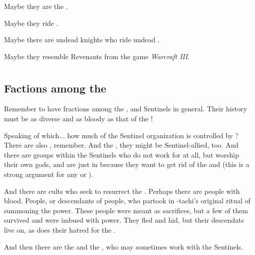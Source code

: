 Maybe they are the . 

Maybe they ride \hs{\vreiiden}.

Maybe there are undead knights who ride undead \vreiiden.

Maybe they resemble Revenants from the game \emph{Warcraft III}. 























\section{\Dragons}
\label{Dragons}
\subsection{Factions among the \dragons}
Remember to have fractions among the \dragons{}, and Sentinels in general. Their history must be as diverse and as bloody as that of the \resphain!

Speaking of which... how much of the Sentinel organization is controlled by \dragons? There are also \rachyth, remember. And the \Baelzerach, they might be Sentinel-allied, too. And there are groups within the Sentinels who do not work for \dragons{} at all, but worship their own gods, and are just in because they want to get rid of the \banes{} and \resphain{} (this is a strong argument for any \scatha{} or \rachyth). 

And there are cults who seek to resurrect the \thzantzais. Perhaps there are people with \thzantzaic{} blood. People, or descendants of people, who partook in \Tiamat-tachi's original ritual of summoning the \thzantzaic{} power. These people were meant as sacrifices, but a few of them survived and were imbued with \thzantzaic{} power. They fled and hid, but their descendats live on, as does their hatred for the \draecchonosh. 

And then there are the \ophidians{} and the \nagae{}, who may sometimes work with the Sentinels. 









